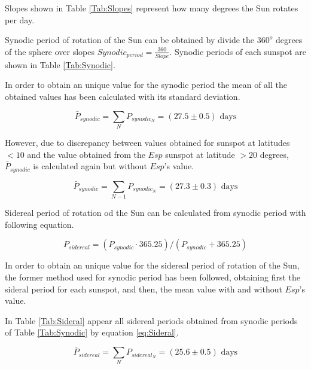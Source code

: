 \documentclass[twoside]{article}
\begin{document}
\begin{multicols}{2}
			Slopes shown in Table \ref{Tab:Slopes} represent how many degrees the Sun rotates per day.

				

			Synodic period of rotation of the Sun can be obtained by divide the $360^o$ degrees of the sphere over slopes $Synodic_{period} = \frac{360}{Slope}$. Synodic periods of each sunspot are shown in Table \ref{Tab:Synodic}.

				

			In order to obtain an unique value for the synodic period the mean of all the obtained values has been calculated with its standard deviation.

				\begin{equation}
					\bar{P}_{synodic} = \sum_N P_{synodic_N} = (27.5 \pm 0.5) \textrm{ days}
					\label{eq:SynodicMean}
				\end{equation}

			However, due to discrepancy between values obtained for sunspot at latitudes $<10$ and the value obtained from the $Esp$ sunspot at latitude $>20$ degrees, $\bar{P}_{synodic}$ is calculated again but without $Esp$'s value.

				\begin{equation}
					\bar{P}_{synodic} = \sum_{N-1} P_{synodic_N} = (27.3 \pm 0.3) \textrm{ days}
					\label{eq:SynodicMeanWhitout}
				\end{equation}

			Sidereal period of rotation od the Sun can be calculated from synodic period with following equation.

				\begin{equation}
					P_{sidereal}=  (P_{synodic} \cdot 365.25) / (P_{synodic} + 365.25) 
					\label{eq:Sideral}
				\end{equation}

			In order to obtain an unique value for the sidereal period of rotation of the Sun, the former method used for synodic period has been followed, obtaining first the sideral period for each sunspot, and then, the mean value with and without $Esp$'s value.

			In Table \ref{Tab:Sideral} appear all sidereal periods obtained from synodic periods of Table \ref{Tab:Synodic} by equation \ref{eq:Sideral}.

				

				\begin{equation}
					\bar{P}_{sidereal} = \sum_N P_{sidereal_N} = (25.6 \pm 0.5) \textrm{ days}
						\label{eq:sideralMean}
				\end{equation}


\end{multicols}
\end{document}

